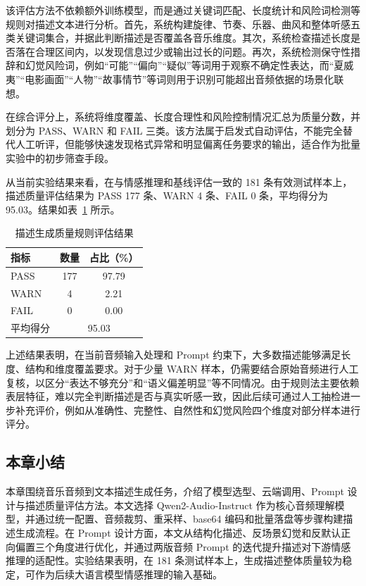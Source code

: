 该评估方法不依赖额外训练模型，而是通过关键词匹配、长度统计和风险词检测等规则对描述文本进行分析。首先，系统构建旋律、节奏、乐器、曲风和整体听感五类关键词集合，并据此判断描述是否覆盖各音乐维度。其次，系统检查描述长度是否落在合理区间内，以发现信息过少或输出过长的问题。再次，系统检测保守性措辞和幻觉风险词，例如“可能”“偏向”“疑似”等词用于观察不确定性表达，而“夏威夷”“电影画面”“人物”“故事情节”等词则用于识别可能超出音频依据的场景化联想。

在综合评分上，系统将维度覆盖、长度合理性和风险控制情况汇总为质量分数，并划分为 PASS、WARN 和 FAIL 三类。该方法属于启发式自动评估，不能完全替代人工听评，但能够快速发现格式异常和明显偏离任务要求的输出，适合作为批量实验中的初步筛查手段。

从当前实验结果来看，在与情感推理和基线评估一致的 181 条有效测试样本上，描述质量评估结果为 PASS 177 条、WARN 4 条、FAIL 0 条，平均得分为 95.03。结果如表~\ref{tab:desc-quality} 所示。

\begin{table}[htbp]
  \centering
  \caption{描述生成质量规则评估结果}
  \label{tab:desc-quality}
  \begin{tabular}{lcc}
    \hline
    指标 & 数量 & 占比（\%） \\
    \hline
    PASS & 177 & 97.79 \\
    WARN & 4 & 2.21 \\
    FAIL & 0 & 0.00 \\
    \hline
    平均得分 & \multicolumn{2}{c}{95.03} \\
    \hline
  \end{tabular}
\end{table}

上述结果表明，在当前音频输入处理和 Prompt 约束下，大多数描述能够满足长度、结构和维度覆盖要求。对于少量 WARN 样本，仍需要结合原始音频进行人工复核，以区分“表达不够充分”和“语义偏差明显”等不同情况。由于规则法主要依赖表层特征，难以完全判断描述是否与真实听感一致，因此后续可通过人工抽检进一步补充评价，例如从准确性、完整性、自然性和幻觉风险四个维度对部分样本进行评分。

\subsection{本章小结}

本章围绕音乐音频到文本描述生成任务，介绍了模型选型、云端调用、Prompt 设计与描述质量评估方法。本文选择 Qwen2-Audio-Instruct 作为核心音频理解模型，并通过统一配置、音频裁剪、重采样、base64 编码和批量落盘等步骤构建描述生成流程。在 Prompt 设计方面，本文从结构化描述、反场景幻觉和反默认正向偏置三个角度进行优化，并通过两版音频 Prompt 的迭代提升描述对下游情感推理的适配性。实验结果表明，在 181 条测试样本上，生成描述整体质量较为稳定，可作为后续大语言模型情感推理的输入基础。

